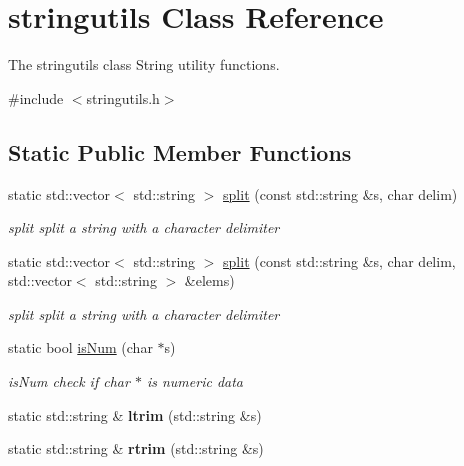 \hypertarget{classstringutils}{\section{stringutils Class Reference}
\label{classstringutils}
}


The stringutils class String utility functions.  




{\ttfamily \#include $<$stringutils.\-h$>$}

\subsection*{Static Public Member Functions}
\begin{DoxyCompactItemize}
\item 
static std\-::vector$<$ std\-::string $>$ \hyperlink{classstringutils_a20745a2b1f3ae2a4c863e65838fc1bef}{split} (const std\-::string \&s, char delim)
\begin{DoxyCompactList}\small\item\em split split a string with a character delimiter \end{DoxyCompactList}\item 
static std\-::vector$<$ std\-::string $>$ \hyperlink{classstringutils_a9d2982b0d17c5fe3911bf1b08ecef115}{split} (const std\-::string \&s, char delim, std\-::vector$<$ std\-::string $>$ \&elems)
\begin{DoxyCompactList}\small\item\em split split a string with a character delimiter \end{DoxyCompactList}\item 
static bool \hyperlink{classstringutils_a945219b9581cac4b3254deac35e9ab02}{is\-Num} (char $\ast$s)
\begin{DoxyCompactList}\small\item\em is\-Num check if char $\ast$ is numeric data \end{DoxyCompactList}\item 
\hypertarget{classstringutils_afb1addddb00afafa45447dc16e73a320}{static std\-::string \& {\bfseries ltrim} (std\-::string \&s)}\label{classstringutils_afb1addddb00afafa45447dc16e73a320}

\item 
\hypertarget{classstringutils_a7326b94129fb258d0ed42e0228b3a5b2}{static std\-::string \& {\bfseries rtrim} (std\-::string \&s)}\label{classstringutils_a7326b94129fb258d0ed42e0228b3a5b2}


\end{DoxyCompactItemize}
